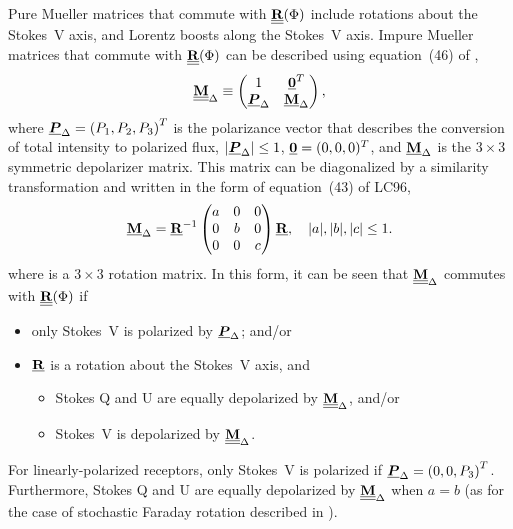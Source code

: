 Pure Mueller matrices that commute with $\underline{\underline{{\bf R}}}(\Phi)$ include
rotations about the Stokes~V axis, and 
Lorentz boosts along the Stokes~V axis.
%
Impure Mueller matrices that commute with $\underline{\underline{{\bf R}}}(\Phi)$ can be described using
equation~(46) of \citet[][hereafter LC96]{lc96},
%
\begin{equation}
\begingroup
\setlength\arraycolsep{5pt}
\MM{M}_\Delta \equiv
\begin{pmatrix}
  1 & \Pv{0}^T \\
  \Pv{P}_\Delta & \PM{M}_\Delta
\end{pmatrix},
\endgroup
\end{equation}
%
where $\underline{\mbox{\boldmath $P$}}_\Delta = \left( P_{1}, P_{2}, P_{3} \right)^T$
is the polarizance vector that describes 
the conversion of total intensity to polarized flux, 
$|\underline{\mbox{\boldmath $P$}}_\Delta| \le 1$,
$\underline{\mbox{\boldmath $0$}} = (0,0,0)^T$, 
and $\underline{{\bf M}}_\Delta$ is the $3\times3$
symmetric depolarizer matrix.
This matrix can be diagonalized by a similarity transformation and
written in the form of equation~(43) of LC96,
%
\begin{equation}
\begingroup
\setlength\arraycolsep{5pt}
\PM{M}_\Delta = {\PM{R}}^{-1}
\begin{pmatrix}
  a & 0 & 0 \\
  0 & b & 0 \\
  0 & 0 & c \\
\end{pmatrix} {\PM{R}}, 
\endgroup
\quad |a|, |b|, |c| \le 1.
\end{equation}
%
where {} is a $3 \times 3$ rotation matrix.  In this form, it 
can be seen that $\underline{\underline{{\bf M}}}_\Delta$ commutes with $\underline{\underline{{\bf R}}}(\Phi)$ if
%
\begin{itemize}
\item only Stokes~V is polarized by $\underline{\mbox{\boldmath $P$}}_\Delta$; and/or
\item ${\underline{{\bf R}}}$ is a rotation about the Stokes~V axis, and
\begin{itemize}
\item Stokes Q and U are equally depolarized by $\underline{\underline{{\bf M}}}_\Delta$, and/or
\item Stokes~V is depolarized by $\underline{\underline{{\bf M}}}_\Delta$.
\end{itemize}
\end{itemize}
%
For linearly-polarized receptors, 
only Stokes~V is polarized if $\underline{\mbox{\boldmath $P$}}_\Delta = \left(0,0,P_{3}\right)^T$.
Furthermore, Stokes Q and U are equally depolarized by $\underline{\underline{{\bf M}}}_\Delta$ when $a = b$
(as for the case of stochastic Faraday rotation described in ).

